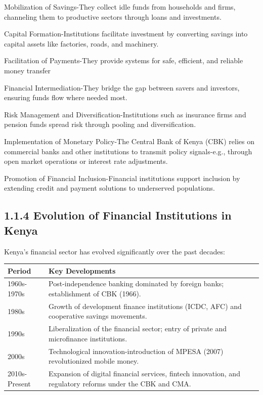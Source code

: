 \documentclass[10pt]{article}
\begin{document}
Mobilization of Savings-They collect idle funds from households and firms, channeling them to productive sectors through loans and investments.

Capital Formation-Institutions facilitate investment by converting savings into capital assets like factories, roads, and machinery.

Facilitation of Payments-They provide systems for safe, efficient, and reliable money transfer

Financial Intermediation-They bridge the gap between savers and investors, ensuring funds flow where needed most.

Risk Management and Diversification-Institutions such as insurance firms and pension funds spread risk through pooling and diversification.

Implementation of Monetary Policy-The Central Bank of Kenya (CBK) relies on commercial banks and other institutions to transmit policy signals-e.g., through open market operations or interest rate adjustments.

Promotion of Financial Inclusion-Financial institutions support inclusion by extending credit and payment solutions to underserved populations.

\subsection*{1.1.4 Evolution of Financial Institutions in Kenya}
Kenya's financial sector has evolved significantly over the past decades:

\begin{center}
\begin{tabular}{|l|l|}
\hline
Period & Key Developments \\
\hline
1960s-1970s & Post-independence banking dominated by foreign banks; establishment of CBK (1966). \\
\hline
1980s & Growth of development finance institutions (ICDC, AFC) and cooperative savings movements. \\
\hline
1990s & Liberalization of the financial sector; entry of private and microfinance institutions. \\
\hline
2000s & Technological innovation-introduction of MPESA (2007) revolutionized mobile money. \\
\hline
2010s-Present & Expansion of digital financial services, fintech innovation, and regulatory reforms under the CBK and CMA. \\
\hline
\end{tabular}
\end{center}
\end{document}
